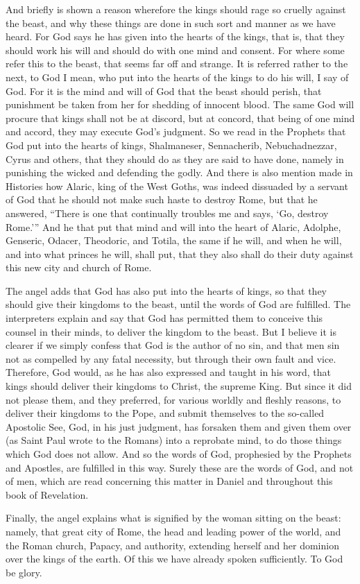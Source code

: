 And briefly is shown a reason wherefore the kings should rage so cruelly against the beast, and why these things are done in such sort and manner as we have heard. For God says he has given into the hearts of the kings, that is, that they should work his will and should do with one mind and consent. For where some refer this to the beast, that seems far off and strange. It is referred rather to the next, to God I mean, who put into the hearts of the kings to do his will, I say of God. For it is the mind and will of God that the beast should perish, that punishment be taken from her for shedding of innocent blood. The same God will procure that kings shall not be at discord, but at concord, that being of one mind and accord, they may execute God’s judgment. So we read in the Prophets that God put into the hearts of kings, Shalmaneser, Sennacherib, Nebuchadnezzar, Cyrus and others, that they should do as they are said to have done, namely in punishing the wicked and defending the godly. And there is also mention made in Histories how Alaric, king of the West Goths, was indeed dissuaded by a servant of God that he should not make such haste to destroy Rome, but that he answered, “There is one that continually troubles me and says, ‘Go, destroy Rome.’” And he that put that mind and will into the heart of Alaric, Adolphe, Genseric, Odacer, Theodoric, and Totila, the same if he will, and when he will, and into what princes he will, shall put, that they also shall do their duty against this new city and church of Rome.

The angel adds that God has also put into the hearts of kings, so that they should give their kingdoms to the beast, until the words of God are fulfilled. The interpreters explain and say that God has permitted them to conceive this counsel in their minds, to deliver the kingdom to the beast. But I believe it is clearer if we simply confess that God is the author of no sin, and that men sin not as compelled by any fatal necessity, but through their own fault and vice. Therefore, God would, as he has also expressed and taught in his word, that kings should deliver their kingdoms to Christ, the supreme King. But since it did not please them, and they preferred, for various worldly and fleshly reasons, to deliver their kingdoms to the Pope, and submit themselves to the so-called Apostolic See, God, in his just judgment, has forsaken them and given them over (as Saint Paul wrote to the Romans) into a reprobate mind, to do those things which God does not allow. And so the words of God, prophesied by the Prophets and Apostles, are fulfilled in this way. Surely these are the words of God, and not of men, which are read concerning this matter in Daniel and throughout this book of Revelation.

Finally, the angel explains what is signified by the woman sitting on the beast: namely, that great city of Rome, the head and leading power of the world, and the Roman church, Papacy, and authority, extending herself and her dominion over the kings of the earth. Of this we have already spoken sufficiently. To God be glory.
